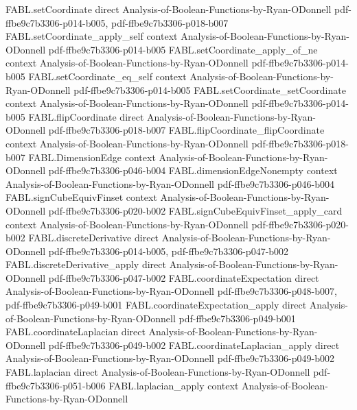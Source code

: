 \begin{theorem}
  {FABL.setCoordinate}
  {direct}
  {Analysis-of-Boolean-Functions-by-Ryan-ODonnell}
  {pdf-ffbe9c7b3306-p014-b005,
    pdf-ffbe9c7b3306-p018-b007}
\proofstep
  {FABL.setCoordinate_apply_self}
  {context}
  {Analysis-of-Boolean-Functions-by-Ryan-ODonnell}
  {pdf-ffbe9c7b3306-p014-b005}
\proofstep
  {FABL.setCoordinate_apply_of_ne}
  {context}
  {Analysis-of-Boolean-Functions-by-Ryan-ODonnell}
  {pdf-ffbe9c7b3306-p014-b005}
\proofstep
  {FABL.setCoordinate_eq_self}
  {context}
  {Analysis-of-Boolean-Functions-by-Ryan-ODonnell}
  {pdf-ffbe9c7b3306-p014-b005}
\proofstep
  {FABL.setCoordinate_setCoordinate}
  {context}
  {Analysis-of-Boolean-Functions-by-Ryan-ODonnell}
  {pdf-ffbe9c7b3306-p014-b005}
\proofstep
  {FABL.flipCoordinate}
  {direct}
  {Analysis-of-Boolean-Functions-by-Ryan-ODonnell}
  {pdf-ffbe9c7b3306-p018-b007}
\proofstep
  {FABL.flipCoordinate_flipCoordinate}
  {context}
  {Analysis-of-Boolean-Functions-by-Ryan-ODonnell}
  {pdf-ffbe9c7b3306-p018-b007}
\proofstep
  {FABL.DimensionEdge}
  {context}
  {Analysis-of-Boolean-Functions-by-Ryan-ODonnell}
  {pdf-ffbe9c7b3306-p046-b004}
\proofstep
  {FABL.dimensionEdgeNonempty}
  {context}
  {Analysis-of-Boolean-Functions-by-Ryan-ODonnell}
  {pdf-ffbe9c7b3306-p046-b004}
\proofstep
  {FABL.signCubeEquivFinset}
  {context}
  {Analysis-of-Boolean-Functions-by-Ryan-ODonnell}
  {pdf-ffbe9c7b3306-p020-b002}
\proofstep
  {FABL.signCubeEquivFinset_apply_card}
  {context}
  {Analysis-of-Boolean-Functions-by-Ryan-ODonnell}
  {pdf-ffbe9c7b3306-p020-b002}
\proofstep
  {FABL.discreteDerivative}
  {direct}
  {Analysis-of-Boolean-Functions-by-Ryan-ODonnell}
  {pdf-ffbe9c7b3306-p014-b005,
    pdf-ffbe9c7b3306-p047-b002}
\proofstep
  {FABL.discreteDerivative_apply}
  {direct}
  {Analysis-of-Boolean-Functions-by-Ryan-ODonnell}
  {pdf-ffbe9c7b3306-p047-b002}
\proofstep
  {FABL.coordinateExpectation}
  {direct}
  {Analysis-of-Boolean-Functions-by-Ryan-ODonnell}
  {pdf-ffbe9c7b3306-p048-b007,
    pdf-ffbe9c7b3306-p049-b001}
\proofstep
  {FABL.coordinateExpectation_apply}
  {direct}
  {Analysis-of-Boolean-Functions-by-Ryan-ODonnell}
  {pdf-ffbe9c7b3306-p049-b001}
\proofstep
  {FABL.coordinateLaplacian}
  {direct}
  {Analysis-of-Boolean-Functions-by-Ryan-ODonnell}
  {pdf-ffbe9c7b3306-p049-b002}
\proofstep
  {FABL.coordinateLaplacian_apply}
  {direct}
  {Analysis-of-Boolean-Functions-by-Ryan-ODonnell}
  {pdf-ffbe9c7b3306-p049-b002}
\proofstep
  {FABL.laplacian}
  {direct}
  {Analysis-of-Boolean-Functions-by-Ryan-ODonnell}
  {pdf-ffbe9c7b3306-p051-b006}
\proofstep
  {FABL.laplacian_apply}
  {context}
  {Analysis-of-Boolean-Functions-by-Ryan-ODonnell}

\end{theorem}

